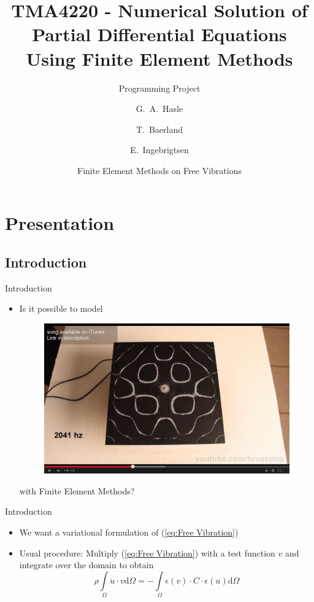 \documentclass{beamer}[10pt]
\title{TMA4220 - Numerical Solution of Partial Differential Equations Using Finite Element Methods}
\subtitle{Programming Project}
\author{G.~A.~Hasle \and T.~Baerland \and E.~Ingebrigtsen}
\date{Finite Element Methods on Free Vibrations}
\begin{document}
\begin{frame}
  \titlepage
\end{frame}

\section{Presentation}

\subsection{Introduction}
\begin{frame}{Introduction}
  \begin{itemize}
  \begin{block}{The Free Vibration Equation}
\begin{equation}
\rho\frac{\partial^2u}{\partial t^2} = \nabla\sigma(u)
\label{eq:Free Vibration}
\end{equation}
\end{block}
  \item {   
    Is it possible to model 
    \begin{figure}
    \centering
    \includegraphics[scale=0.1]{yosnap.png}
    \end{figure}
	with Finite Element Methods?  
  }
  \end{itemize}
\end{frame}

\begin{frame}{Introduction}	
\begin{itemize}
\item {
We want a variational formulation of (\ref{eq:Free Vibration})

}
\item {
Usual procedure: Multiply (\ref{eq:Free Vibration}) with a test function $v$ and integrate over the domain to obtain 
\begin{equation}
\rho \int\limits_{\Omega} \ddot{u}\cdot v\mathrm{d}\Omega = - \int\limits_{\Omega}\epsilon\left(v\right)\cdot C \cdot \epsilon\left(u\right)\mathrm{d}\Omega
\label{eq:Variational Form}
\end{equation}
}
\end{itemize}
\end{frame}
\end{document}
